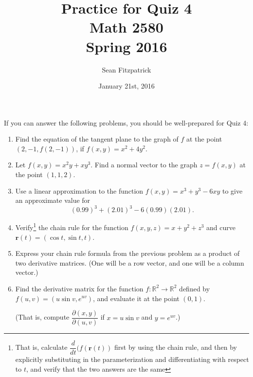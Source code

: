 \documentclass[letterpaper,12pt]{article}
\title{Practice for Quiz 4\\Math 2580\\Spring 2016}
\author{Sean Fitzpatrick}
\date{January 21st, 2016}
\newcommand{\R}{\mathbb{R}}
\begin{document}
 \maketitle

If you can answer the following problems, you should be well-prepared for Quiz 4:



\begin{enumerate}
 \item Find the equation of the tangent plane to the graph of $f$ at the point $(2,-1,f(2,-1))$, if $f(x,y) = x^2+4y^2$.
 \item Let $f(x,y)=x^2y+xy^3$. Find a normal vector to the graph $z=f(x,y)$ at the point $(1,1,2)$.
 \item Use a linear approximation to the function $f(x,y) = x^3+y^3-6xy$ to give an approximate value for
\[
 (0.99)^3+(2.01)^3-6(0.99)(2.01).
\]
 \item Verify\footnote{That is, calculate $\dfrac{d}{dt}(f(\mathbf{r}(t))$ first by using the chain rule, and then by explicitly substituting in the parameterization and differentiating with respect to $t$, and verify that the two answers are the same} the chain rule for the function $f(x,y,z) = x+y^2+z^3$ and curve $\mathbf{r}(t)=(\cos t,\sin t, t)$.
 \item Express your chain rule formula from the previous problem as a product of two derivative matrices. (One will be a row vector, and one will be a column vector.)
 \item Find the derivative matrix for the function $f:\R^2\to \R^2$ defined by $f(u,v) = (u\sin v, e^{uv})$, and evaluate it at the point $(0,1)$.

(That is, compute $\dfrac{\partial(x,y)}{\partial (u,v)}$ if $x=u\sin v$ and $y=e^{uv}$.)

 
\end{enumerate}
\end{document}
